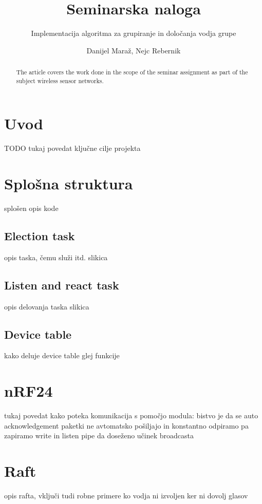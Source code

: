 \documentclass[runningheads]{llncs}
\begin{document}
\title{Seminarska naloga}
\subtitle{Implementacija algoritma za grupiranje in določanja vodja grupe}

\author{Danijel Maraž, Nejc Rebernik}


\maketitle             

\begin{abstract}
The article covers the work done in the scope of the seminar assignment as part of the subject wireless sensor networks.

\end{abstract}

\section{Uvod}
TODO tukaj povedat ključne cilje projekta 

\section{Splošna struktura}
splošen opis kode
\subsection{Election task}
opis taska, čemu služi itd. slikica
\subsection{Listen and react task}
opis delovanja taska slikica
\subsection{Device table}
kako deluje device table glej funkcije
\section{nRF24}
tukaj povedat kako poteka komunikacija s pomočjo modula:
bistvo je da se auto acknowledgement paketki ne avtomatsko pošiljajo in konstantno odpiramo pa zapiramo write in listen pipe da doseženo učinek broadcasta
\section{Raft}
opis rafta, vključi tudi robne primere ko vodja ni izvoljen ker ni dovolj glasov
\end{document}
